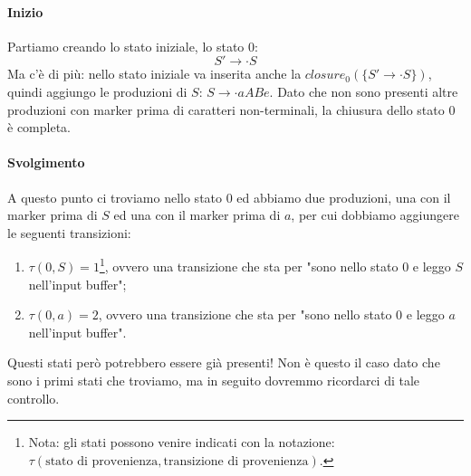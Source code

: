 \documentclass[class=book, crop=false, oneside, 12pt]{standalone}
\begin{document}
\paragraph{Inizio}
Partiamo creando lo stato iniziale, lo stato \(0\):
\begin{equation*}
    S' \to \cdot S
\end{equation*}
Ma c'è di più: nello stato iniziale va inserita anche la \(closure_0(\{ S' \to \cdot S \})\), quindi aggiungo le produzioni di \(S\): \(S \to \cdot aABe\). Dato che non sono presenti altre produzioni con marker prima di caratteri non-terminali, la chiusura dello stato \(0\) è completa.

\paragraph{Svolgimento}
A questo punto ci troviamo nello stato \(0\) ed abbiamo due produzioni, una con il marker prima di \(S\) ed una con il marker prima di \(a\), per cui dobbiamo aggiungere le seguenti transizioni:
\begin{enumerate}
    \item \(\tau (0, S) = 1\)\footnote{Nota: gli stati possono venire indicati con la notazione: \(\tau( \textrm{stato di provenienza}, \textrm{transizione di provenienza})\).}, ovvero una transizione che sta per "sono nello stato \(0\) e leggo \(S\) nell'input buffer";
    \item \(\tau (0, a) = 2\), ovvero una transizione che sta per "sono nello stato \(0\) e leggo \(a\) nell'input buffer".
\end{enumerate}
Questi stati però potrebbero essere già presenti! Non è questo il caso dato che sono i primi stati che troviamo, ma in seguito dovremmo ricordarci di tale controllo. \\
\end{document}
